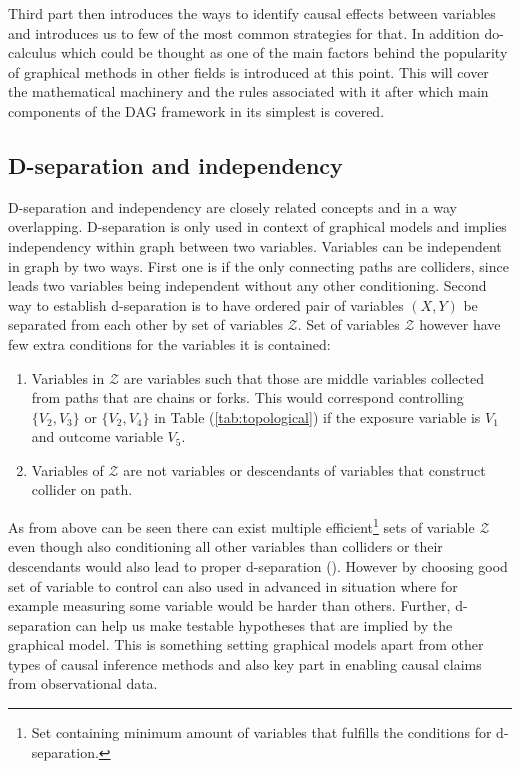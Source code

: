 \documentclass[main=english,12pt,a4paper,pdftex,econ,utf8]{aaltothesis}
\newcommand{\z}{\mathcal{Z}}
\begin{document}
Third part then introduces the ways to identify causal effects between variables and introduces us to few of the most common strategies for that. In addition do-calculus which could be thought as one of the main factors behind the popularity of graphical methods in other fields is introduced at this point. This will cover the mathematical machinery and the rules associated with it after which main components of the DAG framework in its simplest is covered.

\subsection{D-separation and independency}

D-separation and independency are closely related concepts and in a way overlapping. D-separation is only used in context of graphical models and implies independency within graph between two variables. Variables can be independent in graph by two ways. First one is if the only connecting paths are colliders, since leads two variables being independent without any other conditioning. Second way to establish d-separation is to have ordered pair of variables $(X, Y)$ be separated from each other by set of variables $\z$. Set of variables $\z$ however have few extra conditions for the variables it is contained:

\begin{enumerate}
    \item Variables in $\z$ are variables such that those are middle variables collected from paths that are chains or forks. This would correspond controlling $\{V_{2},V_{3}\}$ or $\{V_{2},V_{4}\}$ in Table (\ref{tab:topological}) if the exposure variable is $V_{1}$ and outcome variable $V_{5}$.
    \item Variables of $\z$ are not variables or descendants of variables that construct collider on path.
\end{enumerate}

As from above can be seen there can exist multiple efficient{\hypersetup{linkcolor=black}\footnote{Set containing minimum amount of variables that fulfills the conditions for d-separation.}} sets of variable $\z$ even though also conditioning all other variables than colliders or their descendants would also lead to proper d-separation (\cite{Pearl2016}). However by choosing good set of variable to control can also used in advanced in situation where for example measuring some variable would be harder than others. Further, d-separation can help us make testable hypotheses that are implied by the graphical model. This is something setting graphical models apart from other types of causal inference methods and also key part in enabling causal claims from observational data.
\end{document}
